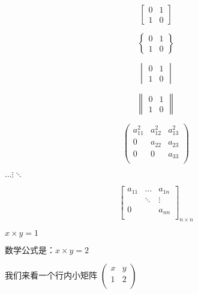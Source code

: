 \documentclass[]{ctexart}
\begin{document}
	\[
		\begin{bmatrix}
			0 & 1 \\
			1 & 0
		\end{bmatrix}
	\]
	
	\[
		\begin{Bmatrix}
			0 & 1 \\
			1 & 0
		\end{Bmatrix}
	\]
	
	\[
		\begin{vmatrix}
			0 & 1 \\
			1 & 0
		\end{vmatrix}
	\]
	
	\[
		\begin{Vmatrix}
			0 & 1 \\
			1 & 0
		\end{Vmatrix}
	\]
 	
 	\[
 		\begin{pmatrix}
 		a_{11}^{2} & a_{12}^{2} & a_{13}^{2} \\
 		0	& a_{22} & a_{23} \\
 		0 & 0 & a_{33} \\
 		\end{pmatrix}
 	\]
 	
 	\(	\dots  \vdots  \ddots \)
 	
 	
 	\[
 		\begin{bmatrix}
 		a_{11} & \dots	& a_{1n} \\
 		       & \ddots & \vdots \\
 		0	   & 		& a_{nn} \\
 		\end{bmatrix} _{n \times n}
 	\]
 	
 	$ x \times y =1 $
 	
 	$ \text{数学公式是：} x \times y = 2 $
 	
 	我们来看一个行内小矩阵 
 	\begin{math}
 		\left( %
 		\begin{smallmatrix}
 		x & y \\
 		1 & 2 \\
 		\end{smallmatrix}
 		\right)
 	\end{math}
 	
\end{document}
